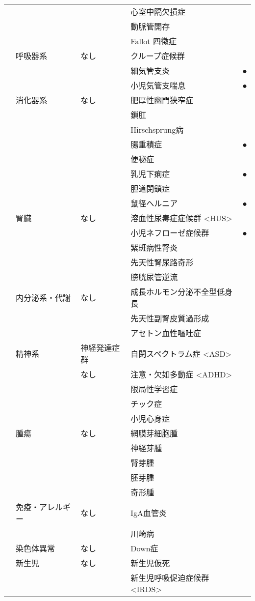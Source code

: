 \begin{xltabular}{\linewidth}{XXXXX}
 &  &  & 心室中隔欠損症 &  \\
 &  &  & 動脈管開存 &  \\
 &  &  & Fallot 四徴症 &  \\
 & 呼吸器系 & なし & クループ症候群 &  \\
 &  &  & 細気管支炎 & ● \\
 &  &  & 小児気管支喘息 & ● \\
 & 消化器系 & なし & 肥厚性幽門狭窄症 &  \\
 &  &  & 鎖肛 &  \\
 &  &  & Hirschsprung病 &  \\
 &  &  & 腸重積症 & ● \\
 &  &  & 便秘症 &  \\
 &  &  & 乳児下痢症 & ● \\
 &  &  & 胆道閉鎖症 &  \\
 &  &  & 鼠径ヘルニア & ● \\
 & 腎臓 & なし & 溶血性尿毒症症候群 <HUS> &  \\
 &  &  & 小児ネフローゼ症候群 & ● \\
 &  &  & 紫斑病性腎炎 &  \\
 &  &  & 先天性腎尿路奇形 &  \\
 &  &  & 膀胱尿管逆流 &  \\
 & 内分泌系・代謝 & なし & 成長ホルモン分泌不全型低身長 &  \\
 &  &  & 先天性副腎皮質過形成 &  \\
 &  &  & アセトン血性嘔吐症 &  \\
 & 精神系 & 神経発達症群 & 自閉スペクトラム症 <ASD> &  \\
 &  & なし & 注意・欠如多動症 <ADHD> &  \\
 &  &  & 限局性学習症 &  \\
 &  &  & チック症 &  \\
 &  &  & 小児心身症 &  \\
 & 腫瘍 & なし & 網膜芽細胞腫 &  \\
 &  &  & 神経芽腫 &  \\
 &  &  & 腎芽腫 &  \\
 &  &  & 胚芽腫 &  \\
 &  &  & 奇形腫 &  \\
 & 免疫・アレルギー & なし & IgA血管炎 &  \\
 &  &  & 川崎病 &  \\
 & 染色体異常 & なし & Down症 &  \\
 & 新生児 & なし & 新生児仮死 &  \\
 &  &  & 新生児呼吸促迫症候群 <IRDS> &  \\

\end{xltabular}

